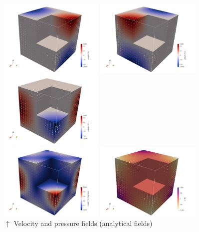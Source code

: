\begin{center}
\includegraphics[width=5cm]{python_codes/fieldstone_75/results/mms3D/u}
\includegraphics[width=5cm]{python_codes/fieldstone_75/results/mms3D/v}
\includegraphics[width=5cm]{python_codes/fieldstone_75/results/mms3D/w}\\
\includegraphics[width=5cm]{python_codes/fieldstone_75/results/mms3D/vel}
\includegraphics[width=5cm]{python_codes/fieldstone_75/results/mms3D/p}\\
{\captionfont $\uparrow$ Velocity and pressure fields (analytical fields)}
\end{center}

